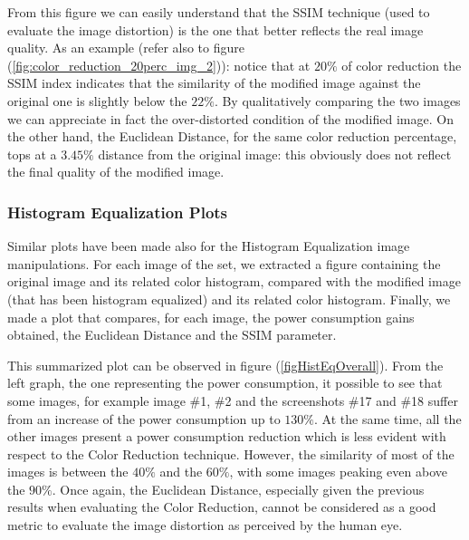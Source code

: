 \documentclass[a4paper]{article}
\begin{document}
            From this figure we can easily understand that the SSIM technique (used to evaluate the image distortion) is the one that better reflects the real image quality. As an example (refer also to figure (\ref{fig:color_reduction_20perc_img_2})): notice that at $20\%$ of color reduction the SSIM index indicates that the similarity of the modified image against the original one is slightly below the $22\%$. By qualitatively comparing the two images we can appreciate in fact the over-distorted condition of the modified image. On the other hand, the Euclidean Distance, for the same color reduction percentage, tops at a $3.45\%$ distance from the original image: this obviously does not reflect the final quality of the modified image.

        \subsubsection{Histogram Equalization Plots}
            Similar plots have been made also for the Histogram Equalization image manipulations. For each image of the set, we extracted a figure containing the original image and its related color histogram, compared with the modified image (that has been histogram equalized) and its related color histogram.
            Finally, we made a plot that compares, for each image, the power consumption gains obtained, the Euclidean Distance and the SSIM parameter.

            This summarized plot can be observed in figure (\ref{figHistEqOverall}).
            From the left graph, the one representing the power consumption, it possible to see that some images, for example image \#1, \#2 and the screenshots \#17 and \#18 suffer from an increase of the power consumption up to $130\%$. At the same time, all the other images present a power consumption reduction which is less evident with respect to the Color Reduction technique. However, the similarity of most of the images is between the $40\%$ and the $60\%$, with some images peaking even above the $90\%$. Once again, the Euclidean Distance, especially given the previous results when evaluating the Color Reduction, cannot be considered as a good metric to evaluate the image distortion as perceived by the human eye.
\end{document}
